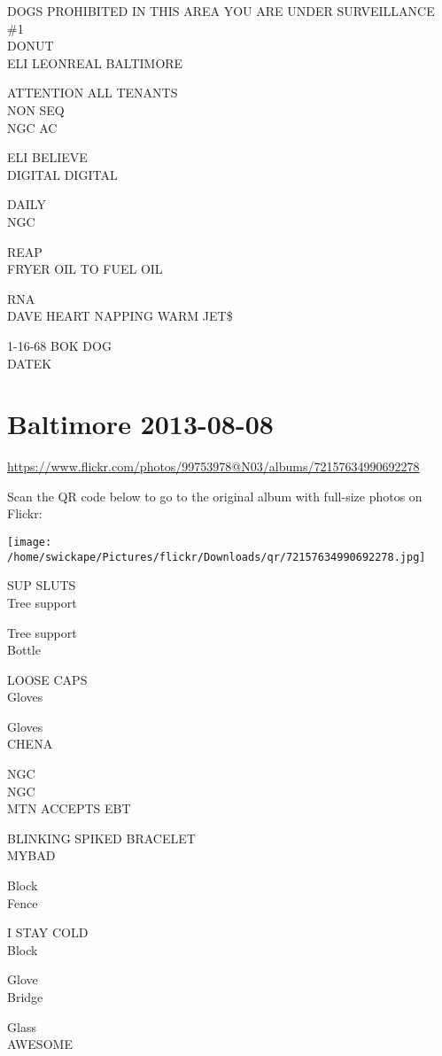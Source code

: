 \documentclass[10pt,letterpaper]{article}
\begin{document}
DOGS PROHIBITED IN THIS AREA YOU ARE UNDER SURVEILLANCE\\
\#1\\
DONUT\\
ELI LEONREAL BALTIMORE

ATTENTION ALL TENANTS\\
NON SEQ\\
NGC AC

ELI BELIEVE\\
DIGITAL DIGITAL

DAILY\\
NGC

REAP\\
FRYER OIL TO FUEL OIL

RNA\\
DAVE HEART NAPPING WARM JET\$

1{-}16{-}68 BOK DOG\\
DATEK
\pagebreak

\section*{Baltimore 2013-08-08}

\url{https://www.flickr.com/photos/99753978@N03/albums/72157634990692278}

Scan the QR code below to go to the original album with full-size photos on Flickr:

\texttt{[image: /home/swickape/Pictures/flickr/Downloads/qr/72157634990692278.jpg]}
\pagebreak

SUP SLUTS\\
Tree support

Tree support\\
Bottle

LOOSE CAPS\\
Gloves

Gloves\\
CHENA

NGC\\
NGC\\
MTN ACCEPTS EBT

BLINKING SPIKED BRACELET\\
MYBAD

Block\\
Fence

I STAY COLD\\
Block

Glove\\
Bridge

Glass\\
AWESOME
\end{document}

